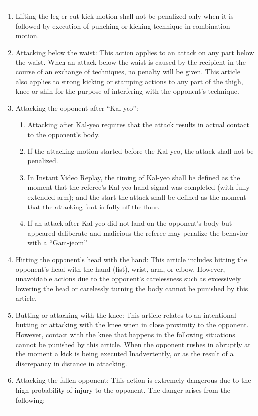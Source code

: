 \documentclass[draft]{report}
\renewcommand{\labelenumii}{\arabic{enumi}.\arabic{enumii}}
\newenvironment{expl}[0]%
  {\rule{\textwidth}{.2pt}\footnotesize}%
  {\rule{\textwidth}{.2pt}\normalsize}
\begin{document}
\begin{expl}
\begin{enumerate}
\begin{enumerate}
\end{enumerate}

\item
  Lifting the leg or cut kick motion shall not be penalized only when it
  is followed by execution of punching or kicking technique in
  combination motion.

\item
  Attacking below the waist: This action applies to an attack on any
  part below the waist. When an attack below the waist is caused by the
  recipient in the course of an exchange of techniques, no penalty will
  be given. This article also applies to strong kicking or stamping
  actions to any part of the thigh, knee or shin for the purpose of
  interfering with the opponent's technique.
\item
  Attacking the opponent after ``Kal-yeo'':

\begin{enumerate}
\def\labelenumii{\alph{enumii})}
\item
  Attacking after Kal-yeo requires that the attack results in actual
contact to the opponent's body.

\item 
  If the attacking motion started before the Kal-yeo, the attack shall not be penalized.

\item 
  In Instant Video Replay, the timing of Kal-yeo shall be defined as the moment that the
  referee's Kal-yeo hand signal was completed (with fully extended arm);
  and the start the attack shall be defined as the moment that the
  attacking foot is fully off the floor.

\item
  If an attack after Kal-yeo did not land on the opponent's body but appeared deliberate and malicious
  the referee may penalize the behavior with a ``Gam-jeom''

\end{enumerate}

\item
  Hitting the opponent's head with the hand: This article includes
  hitting the opponent's head with the hand (fist), wrist, arm, or
  elbow. However, unavoidable actions due to the opponent's carelessness
  such as excessively lowering the head or carelessly turning the body
  cannot be punished by this article.
\item
  Butting or attacking with the knee: This article relates to an
  intentional butting or attacking with the knee when in close proximity
  to the opponent. However, contact with the knee that happens in the
  following situations cannot be punished by this article. When the
  opponent rushes in abruptly at the moment a kick is being executed
  Inadvertently, or as the result of a discrepancy in distance in
  attacking.
\item
  Attacking the fallen opponent: This action is extremely dangerous due
  to the high probability of injury to the opponent. The danger arises
  from the following:


\end{enumerate}
\end{expl}
\end{document}
